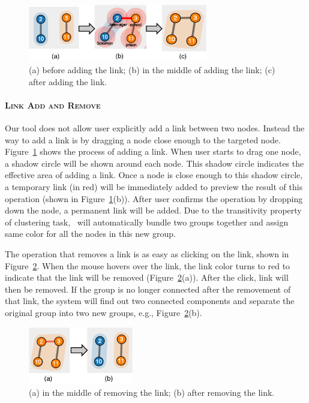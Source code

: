 \begin{figure}[tH]
\begin{center}
\includegraphics[height=2.5cm]{figs/addlink.pdf}
\caption{(a) before adding the link; (b) in the middle of adding the link; (c) after adding the link.}
\label{fig:addlink}
\end{center}
\end{figure}

\paragraph{\textsc{Link Add and Remove}\\}
Our tool does not allow user explicitly add a link between two nodes. Instead the way to add a link is by dragging a node close enough to the targeted node. Figure~\ref{fig:addlink} shows the process of adding a link. When user starts to drag one node, a shadow circle will be shown around each node. This shadow circle indicates the effective area of adding a link. Once a node is close enough to this shadow circle, a temporary link (in red) will be immediately added to preview the result of this operation (shown in Figure~\ref{fig:addlink}(b)). After user confirms the operation by dropping down the node, a permanent link will be added. Due to the transitivity property of clustering task, \sys\ will automatically bundle two groups together and assign same color for all the nodes in this new group.

The operation that removes a link is as easy as clicking on the link, shown in Figure~\ref{fig:rmlink}. When the mouse hovers over the link, the link color turns to red to indicate that the link will be removed (Figure~\ref{fig:rmlink}(a)). After the click, link will then be removed. If the group is no longer connected after the removement of that link, the system will find out two connected components and separate the original group into two new groups, e.g., Figure~\ref{fig:rmlink}(b).

\begin{figure}[tH]
\begin{center}
\includegraphics[height=2.5cm]{figs/removelink.pdf}
\caption{(a) in the middle of removing the link; (b) after removing the link.}
\label{fig:rmlink}
\end{center}
\end{figure}

